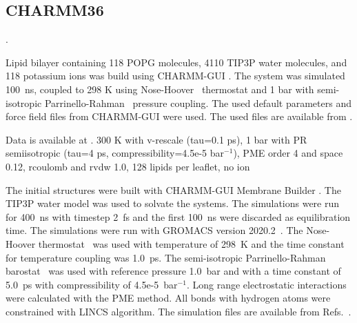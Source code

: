 \documentclass[journal=jpcbfk]{achemso}
\begin{document}
\clearpage

\subsection{CHARMM36}

 .


 Lipid bilayer containing 118 POPG molecules, 4110 TIP3P water molecules, and 118 potassium ions was build using CHARMM-GUI \cite{lee16}.
The system was simulated 100~ns, coupled to 298 K using Nose-Hoover~\cite{nose84,hoover85} thermostat and 1 bar with
semi-isotropic Parrinello-Rahman~\cite{parrinello81} pressure coupling.
The used default parameters and force field files from CHARMM-GUI were used.
The used files are available from .



 Data is available at \cite{POPCcharmm300K,POPC1POPE1charmm36}.
300 K with v-rescale (tau=0.1 ps),
1 bar with PR semiisotropic (tau=4 ps, compressibility=4.5e-5 bar$^{-1}$),
PME order 4 and space 0.12,
rcoulomb and rvdw 1.0,
128 lipids per leaflet,
no ion 

The initial structures were built with CHARMM-GUI Membrane Builder \cite{lee16}. The TIP3P water model was used to solvate the systems. The simulations were run for 400~ns with timestep 2~fs and the first 100~ns were discarded as equilibration time. The simulations were run with GROMACS version 2020.2~\cite{pall20}. The Nose-Hoover thermostat~\cite{nose84,hoover85} was used with temperature of 298~K and the time constant for temperature coupling was 1.0~ps. The semi-isotropic Parrinello-Rahman barostat~\cite{parrinello81} was used with reference pressure 1.0~bar and with a time constant of 5.0~ps with compressibility of 4.5e-5~bar$^{-1}$. Long range electrostatic interactions were calculated with the PME method. All bonds with hydrogen atoms were constrained with LINCS algorithm.
The simulation files are available from Refs.~.
\end{document}
